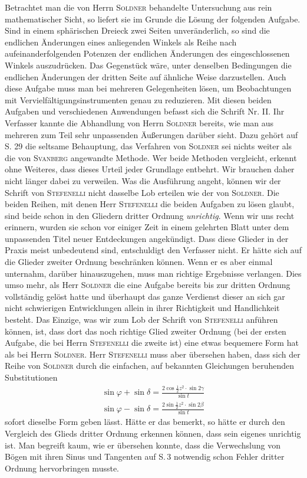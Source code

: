 Betrachtet man die von Herrn \textsc{Soldner} behandelte Untersuchung aus rein mathematischer Sicht, so liefert sie im Grunde die Lösung der folgenden Aufgabe. Sind in einem sphärischen Dreieck zwei Seiten unveränderlich, so sind die endlichen Änderungen eines anliegenden Winkels als Reihe nach aufeinanderfolgenden Potenzen der endlichen Änderungen des eingeschlossenen Winkels auszudrücken. Das Gegenstück wäre, unter denselben Bedingungen die endlichen Änderungen der dritten Seite auf ähnliche Weise darzustellen. Auch diese Aufgabe muss man bei mehreren Gelegenheiten lösen, um Beobachtungen mit Vervielfältigungsinstrumenten genau zu reduzieren. Mit diesen beiden Aufgaben und verschiedenen Anwendungen befasst sich die Schrift Nr. II. Ihr Verfasser kannte die Abhandlung von Herrn \textsc{Soldner} bereits, wie man aus mehreren zum Teil sehr unpassenden Äußerungen darüber sieht. Dazu gehört auf S. 29 die seltsame Behauptung, das Verfahren von \textsc{Soldner} sei nichts weiter als die von \textsc{Svanberg} angewandte Methode. Wer beide Methoden vergleicht, erkennt ohne Weiteres, dass dieses Urteil jeder Grundlage entbehrt. Wir brauchen daher nicht länger dabei zu verweilen. Was die Ausführung angeht, können wir der Schrift von \textsc{Stefenelli} nicht dasselbe Lob erteilen wie der von \textsc{Soldner}. Die beiden Reihen, mit denen Herr \textsc{Stefenelli} die beiden Aufgaben zu lösen glaubt, sind beide schon in den Gliedern dritter Ordnung \emph{unrichtig}. Wenn wir uns recht erinnern, wurden sie schon vor einiger Zeit in einem gelehrten Blatt unter dem unpassenden Titel neuer Entdeckungen angekündigt. Dass diese Glieder in der Praxis meist unbedeutend sind, entschuldigt den Verfasser nicht. Er hätte sich auf die Glieder zweiter Ordnung beschränken können. Wenn er es aber einmal unternahm, darüber hinauszugehen, muss man richtige Ergebnisse verlangen. Dies umso mehr, als Herr \textsc{Soldner} die eine Aufgabe bereits bis zur dritten Ordnung vollständig gelöst hatte und überhaupt das ganze Verdienst dieser an sich gar nicht schwierigen Entwicklungen allein in ihrer Richtigkeit und Handlichkeit besteht. Das Einzige, was wir zum Lob der Schrift von \textsc{Stefenelli} anführen können, ist, dass dort das noch richtige Glied zweiter Ordnung (bei der ersten Aufgabe, die bei Herrn \textsc{Stefenelli} die zweite ist) eine etwas bequemere Form hat als bei Herrn \textsc{Soldner}. Herr \textsc{Stefenelli} muss aber übersehen haben, dass sich der Reihe von \textsc{Soldner} durch die einfachen, auf bekannten Gleichungen beruhenden Substitutionen
\[
\begin{gathered}
\sin\varphi+\sin\delta=\frac{2\cos\frac{1}{2}z^2\cdot\sin2\gamma}{\sin t}\\[5pt]
\sin\varphi-\sin\delta=\frac{2\sin\frac{1}{2}z^2\cdot\sin2\beta}{\sin t}
\end{gathered}
\]
sofort dieselbe Form geben lässt. Hätte er das bemerkt, so hätte er durch den Vergleich des Glieds dritter Ordnung erkennen können, dass sein eigenes unrichtig ist. Man begreift kaum, wie er übersehen konnte, dass die Verwechslung von Bögen mit ihren Sinus und Tangenten auf S.\,3 notwendig schon Fehler dritter Ordnung hervorbringen musste.

